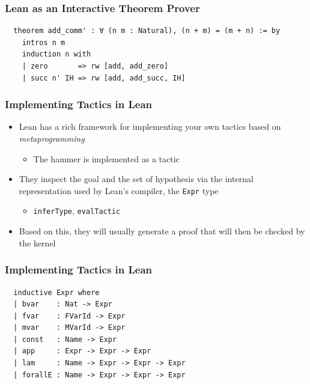 \documentclass[usepdftitle=false,aspectratio=169,usenames,dvipsnames]{beamer}
\newcommand\vitem{\vfill\item}
\begin{document}
\begin{frame}[fragile]
  \frametitle{Lean as an Interactive Theorem Prover}
  \begin{verbatim}
  theorem add_comm' : ∀ (n m : Natural), (n + m) = (m + n) := by
    intros n m
    induction n with
    | zero       => rw [add, add_zero]
    | succ n' IH => rw [add, add_succ, IH]
  \end{verbatim}
\end{frame}

\begin{frame}
  \frametitle{Implementing Tactics in Lean}
  \begin{itemize}
    \item Lean has a rich framework for implementing your own tactics based on \textit{metaprogramming}
    \begin{itemize}
      \item The hammer is implemented as a tactic
    \end{itemize}
    \vitem They inspect the goal and the set of hypothesis via the internal representation used by Lean's compiler, the \texttt{Expr} type
    \begin{itemize}
      \item \texttt{inferType}, \texttt{evalTactic}
    \end{itemize}
    \vitem Based on this, they will usually generate a proof that will then be checked by the kernel
  \end{itemize}
\end{frame}

\begin{frame}[fragile]
  \frametitle{Implementing Tactics in Lean}
  \begin{verbatim}
  inductive Expr where
  | bvar    : Nat -> Expr
  | fvar    : FVarId -> Expr
  | mvar    : MVarId -> Expr
  | const   : Name -> Expr
  | app     : Expr -> Expr -> Expr
  | lam     : Name -> Expr -> Expr -> Expr
  | forallE : Name -> Expr -> Expr -> Expr
  \end{verbatim}

\end{frame}
\end{document}
